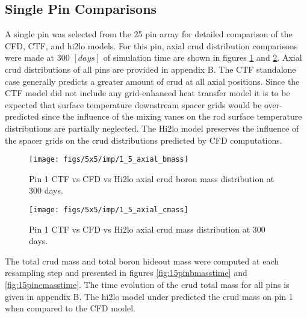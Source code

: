 


\subsection{Single Pin Comparisons}
\label{sec:single_pin_result}

A single pin was selected from the 25 pin array for detailed comparison of the CFD, CTF, and hi2lo models.  For this pin, axial crud distribution comparisons were made at 300 $[days]$ of simulation time are shown in figures \ref{fig:15axialbmass} and \ref{fig:15axialcmass}.  Axial crud distributions of all pins are provided in appendix B.  The CTF standalone case generally predicts a greater amount of crud at all axial positions.  Since the CTF model did not include any grid-enhanced heat transfer model it is to be expected that surface temperature downstream spacer grids would be over-predicted since the influence of the mixing vanes on the rod surface temperature distributions are partially neglected.  The Hi2lo model preserves the influence of the spacer grids on the crud distributions predicted by CFD computations.

\begin{figure}[H]
    \centering
    \texttt{[image: figs/5x5/imp/1\_5\_axial\_bmass]}
    \caption{Pin 1 CTF vs CFD vs Hi2lo axial crud boron mass distribution at 300 days.}
    \label{fig:15axialbmass}
\end{figure}
\begin{figure}[H]
    \centering
    \texttt{[image: figs/5x5/imp/1\_5\_axial\_cmass]}
    \caption{Pin 1 CTF vs CFD vs Hi2lo axial crud mass distribution at 300 days.}
    \label{fig:15axialcmass}
\end{figure}

The total crud mass and total boron hideout mass were computed at each resampling step and presented in figures \ref{fig:15pinbmasstime} and \ref{fig:15pincmasstime}.  The time evolution of the crud total mass for all pins is given in appendix B.  The hi2lo model under predicted the crud mass on pin 1 when compared to the CFD model.

